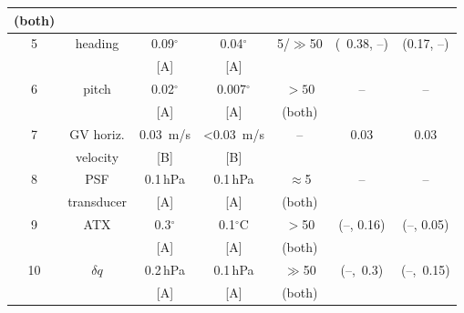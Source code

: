 \documentclass[english,british,amtd,bookmarks=false,unicode=true]{copernicus}\usepackage[]{graphicx}\usepackage[]{color}
\providecommand{\tabularnewline}{\\}
\begin{document}
\begin{table*}
\begin{minipage}[t]{1\columnwidth}
\begin{flushleft}
\begin{tabular}{ccccccc}
(both)  &
 &
\tabularnewline
\midrule 
5  &
heading  &
0.09$^{\circ}$  &
0.04$^{\circ}$  &
5/$\gg$50 &
(~0.38, --)  &
(0.17, --)\tabularnewline
 &
 &
{[}A{]} &
{[}A{]} &
 &
 &
\tabularnewline
\midrule 
6  &
pitch  &
0.02$^{\circ}$  &
0.007$^{\circ}$  &
$>50$ &
--  &
--\tabularnewline
 &
 &
{[}A{]} &
{[}A{]} &
(both) &
 &
\tabularnewline
\midrule 
7  &
GV horiz. &
0.03~m/s  &
<0.03~m/s  &
-- &
0.03  &
0.03\tabularnewline
 &
velocity &
{[}B{]} &
{[}B{]} &
 &
 &
\tabularnewline
\midrule 
8  &
PSF  &
0.1\,hPa  &
0.1\,hPa  &
$\approx$5 &
--  &
--\tabularnewline
 &
transducer  &
{[}A{]} &
{[}A{]} &
(both) &
 &
\tabularnewline
\midrule 
9  &
ATX  &
0.3$^{\circ}$  &
0.1$^{\circ}$C  &
$>$50 &
(--, 0.16)  &
(--, 0.05)\tabularnewline
 &
 &
{[}A{]} &
{[}A{]} &
(both) &
 &
\tabularnewline
\midrule 
10  &
$\delta q$  &
0.2\,hPa  &
0.1\,hPa  &
$\gg$50 &
(--,~0.3)  &
(--,~0.15)\tabularnewline
 &
 &
{[}A{]} &
{[}A{]} &
(both) &
 &
\tabularnewline
\bottomrule
\end{tabular}
\par\end{flushleft}%
\end{minipage}
\end{table*}
\end{document}
